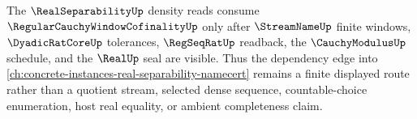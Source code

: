 The $\RealSeparabilityUp$ density reads consume $\RegularCauchyWindowCofinalityUp$ only after $\StreamNameUp$ finite windows, $\DyadicRatCoreUp$ tolerances, $\RegSeqRatUp$ readback, the $\CauchyModulusUp$ schedule, and the $\RealUp$ seal are visible. Thus the dependency edge into \autoref{ch:concrete-instances-real-separability-namecert} remains a finite displayed route rather than a quotient stream, selected dense sequence, countable-choice enumeration, host real equality, or ambient completeness claim.
